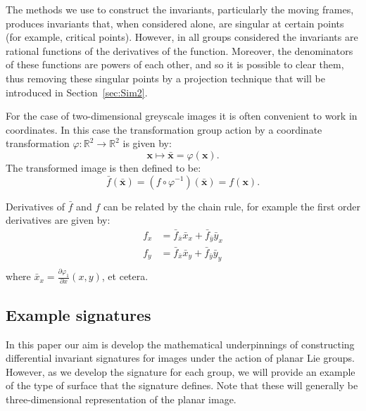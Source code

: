 \documentclass[review,onefignum,onetabnum]{siamonline190516}
\begin{document}
The methods we use to construct the invariants, particularly the moving frames, produces invariants that, when considered alone, are singular at certain points (for example, critical points). However, in all groups considered the invariants are rational functions of the derivatives of the function. Moreover, the denominators of these functions are powers of each other, and so it is possible to clear them, thus removing these singular points by a projection technique that will be introduced in Section~\ref{sec:Sim2}.

For the case of two-dimensional greyscale images it is often convenient to work in coordinates. In this case the transformation group action by a coordinate transformation $\varphi \colon \mathbb{R}^2 \to \mathbb{R}^2$ is given by:
\begin{equation}\label{eq:transformation}
  \mathbf{x} \mapsto \bar{\mathbf{x}} = \varphi(\mathbf{x}).
\end{equation}
The transformed image is then defined to be:
\begin{equation}\label{eq:fbarequalsf}
  \bar{f}(\bar{\mathbf{x}}) = (f\circ\varphi^{-1})(\bar{\mathbf{x}}) = f(\mathbf{x}).
\end{equation}

Derivatives of $\bar{f}$ and $f$ can be related by the chain rule, for example the first order derivatives are given by:
\begin{equation}\label{eq:prolongation}
  \begin{aligned}
    f_x &= \bar{f}_{\bar{x}} \bar{x}_x + \bar{f}_{\bar{y}}\bar{y}_x \\
    f_y &= \bar{f}_{\bar{x}} \bar{x}_y + \bar{f}_{\bar{y}}\bar{y}_y \\
  \end{aligned}
\end{equation}
where $\bar{x}_x = \frac{\partial \varphi_1}{\partial x}(x, y)$, et cetera. %

\subsection{Example signatures}

In this paper our aim is develop the mathematical underpinnings of
constructing differential invariant signatures for images under the action
of planar Lie groups. However, as we develop the signature for each group,
we will provide an example of the type of surface that the signature
defines. Note that these will generally be three-dimensional representation
of the planar image. 
\end{document}
